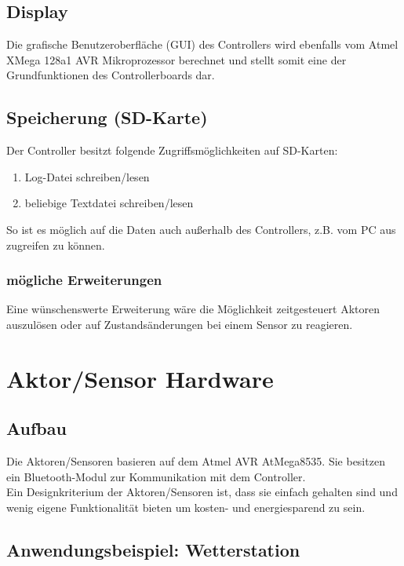 \documentclass[12pt,a4paper]{article}
\begin{document}
\subsection{Display}

Die grafische Benutzeroberfläche (GUI) des Controllers wird ebenfalls vom Atmel XMega 128a1 AVR Mikroprozessor berechnet und stellt somit eine der Grundfunktionen des Controllerboards dar.

\subsection{Speicherung (SD-Karte)}

Der Controller besitzt folgende Zugriffsmöglichkeiten auf SD-Karten:

\begin{enumerate}
	\item Log-Datei schreiben/lesen
	\item beliebige Textdatei schreiben/lesen
\end{enumerate}

So ist es möglich auf die Daten auch außerhalb des Controllers, z.B. vom PC aus zugreifen zu können.

\subsubsection{mögliche Erweiterungen}

Eine wünschenswerte Erweiterung wäre die Möglichkeit zeitgesteuert Aktoren auszulösen oder auf Zustandsänderungen bei einem Sensor zu reagieren.

\section{Aktor/Sensor Hardware}

\subsection{Aufbau}

Die Aktoren/Sensoren basieren auf dem Atmel AVR AtMega8535. Sie besitzen ein Bluetooth-Modul zur Kommunikation mit dem Controller. \\
Ein Designkriterium der Aktoren/Sensoren ist, dass sie einfach gehalten sind und wenig eigene Funktionalität bieten um kosten- und energiesparend zu sein.

\subsection{Anwendungsbeispiel: Wetterstation}
\end{document}
